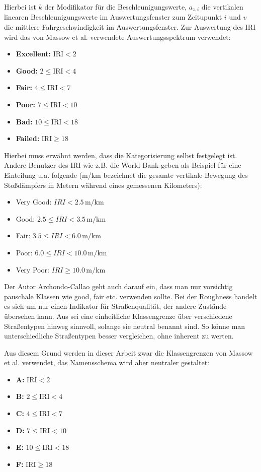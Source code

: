 Hierbei ist $k$ der Modifikator für die Beschleunigungswerte, $a_{z,i}$ die vertikalen linearen Beschleunigungswerte im Auswertungsfenster zum Zeitupunkt $i$ und $v$ die mittlere Fahrgeschwindigkeit im Auswertungsfenster. Zur Auswertung des IRI wird das von Massow et al. verwendete Auswertungsspektrum verwendet: \cite{Massow2024}

\begin{itemize}
    \item \textbf{Excellent:} $\text{IRI} < 2$
    \item \textbf{Good:} $2 \le \text{IRI} < 4$
    \item \textbf{Fair:} $4 \le \text{IRI} < 7$
    \item \textbf{Poor:} $7 \le \text{IRI} < 10$
    \item \textbf{Bad:} $10 \le \text{IRI} < 18$
    \item \textbf{Failed:} $\text{IRI} \ge 18$
\end{itemize}

Hierbei muss erwähnt werden, dass die Kategorisierung selbst festgelegt ist. Andere Benutzer des IRI wie z.B. die World Bank geben als Beispiel für eine Einteilung u.a. folgende (m/km bezeichnet die gesamte vertikale Bewegung des Stoßdämpfers in Metern während eines gemessenen Kilometers):

\begin{itemize}
  \item Very Good: $IRI < 2.5 \,\text{m/km}$
  \item Good: $2.5 \leq IRI < 3.5 \,\text{m/km}$
  \item Fair: $3.5 \leq IRI < 6.0 \,\text{m/km}$
  \item Poor: $6.0 \leq IRI < 10.0 \,\text{m/km}$
  \item Very Poor: $IRI \geq 10.0 \,\text{m/km}$
\end{itemize}

Der Autor Archondo-Callao geht auch darauf ein, dass man nur vorsichtig pauschale Klassen wie good, fair etc. verwenden sollte. Bei der Roughness handelt es sich um nur einen Indikator für Straßenqualität, der andere Zustände übersehen kann. Aus sei eine einheitliche Klassengrenze über verschiedene Straßentypen hinweg sinnvoll, solange sie neutral benannt sind. So könne man unterschiedliche Straßentypen besser vergleichen, ohne inherent zu werten. \cite{Archondo2008}

Aus diesem Grund werden in dieser Arbeit zwar die Klassengrenzen von Massow et al. verwendet, das Namensschema wird aber neutraler gestaltet:
\begin{itemize}
    \item \textbf{A:} $\text{IRI} < 2$
    \item \textbf{B:} $2 \le \text{IRI} < 4$
    \item \textbf{C:} $4 \le \text{IRI} < 7$
    \item \textbf{D:} $7 \le \text{IRI} < 10$
    \item \textbf{E:} $10 \le \text{IRI} < 18$
    \item \textbf{F:} $\text{IRI} \ge 18$
\end{itemize}

